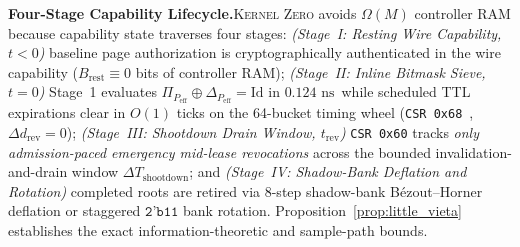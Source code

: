 \documentclass[11pt,letterpaper]{article}
\providecommand{\StageOneNs}{\ensuremath{0.124\text{~ns}}}
\providecommand{\StageOneSieveDelayNs}{\StageOneNs}
\theoremstyle{spectralthm}
\begin{document}
\noindent\textbf{Four-Stage Capability Lifecycle.}\;\textsc{Kernel Zero} avoids $\Omega(M)$ controller RAM because capability state traverses four stages: \textit{(Stage~I: Resting Wire Capability, $t < 0$)} baseline page authorization is cryptographically authenticated in the wire capability ($B_{\mathrm{rest}} \equiv 0$ bits of controller RAM); \textit{(Stage~II: Inline Bitmask Sieve, $t = 0$)} Stage~1 evaluates $\Pi_{P_{\mathrm{eff}}} \oplus \Delta_{P_{\mathrm{eff}}} = \mathrm{Id}$ in \StageOneSieveDelayNs\ while scheduled TTL expirations clear in $O(1)$ ticks on the 64-bucket timing wheel (\texttt{CSR 0x68}~\cite{varghese1997timing}, $\Delta d_{\mathrm{rev}} = 0$); \textit{(Stage~III: Shootdown Drain Window, $t_{\mathrm{rev}}$)} \texttt{CSR 0x60} tracks \emph{only admission-paced emergency mid-lease revocations} across the bounded invalidation-and-drain window $\Delta T_{\mathrm{shootdown}}$; and \textit{(Stage~IV: Shadow-Bank Deflation and Rotation)} completed roots are retired via 8-step shadow-bank B\'{e}zout--Horner deflation or staggered $\texttt{2'b11}$ bank rotation. Proposition~\ref{prop:little_vieta} establishes the exact information-theoretic and sample-path bounds.
\end{document}

